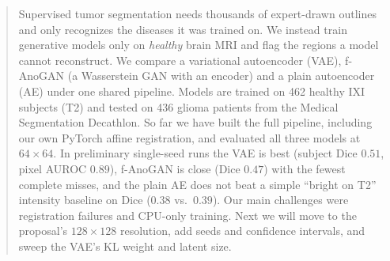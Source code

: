 \documentclass{article}
\begin{document}

\printAffiliationsAndNotice{\icmlEqualContribution}

\begin{abstract}
Supervised tumor segmentation needs thousands of expert-drawn outlines and only
recognizes the diseases it was trained on. We instead train generative models
only on \emph{healthy} brain MRI and flag the regions a model cannot
reconstruct. We compare a variational autoencoder (VAE), f-AnoGAN (a Wasserstein
GAN with an encoder) and a plain autoencoder (AE) under one shared pipeline.
Models are trained on 462 healthy IXI subjects (T2) and tested on 436 glioma
patients from the Medical Segmentation Decathlon. So far we have built the full
pipeline, including our own PyTorch affine registration, and evaluated all three
models at $64\times64$. In preliminary single-seed runs the VAE is best (subject
Dice $0.51$, pixel AUROC $0.89$), f-AnoGAN
is close (Dice $0.47$) with the fewest complete misses, and the plain AE does not
beat a simple ``bright on T2'' intensity baseline on Dice ($0.38$ vs.\ $0.39$).
Our main challenges were registration failures and CPU-only training. Next we will move to the proposal's $128\times128$ resolution, add
seeds and confidence intervals, and sweep the VAE's KL weight and latent size.
\end{abstract}
\end{document}
